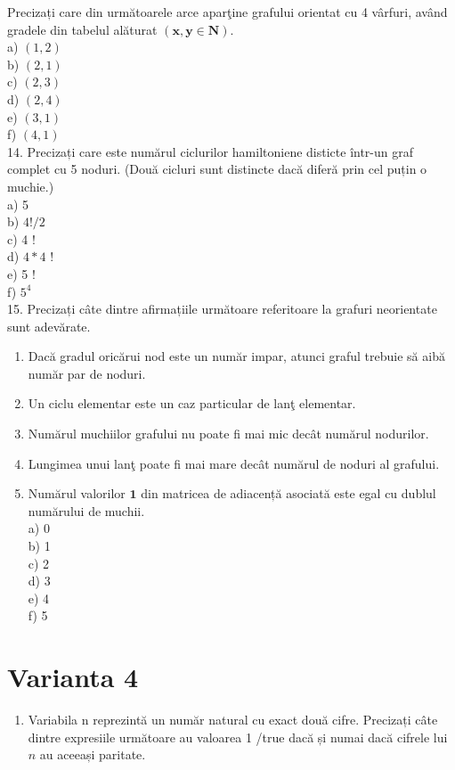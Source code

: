 \documentclass[10pt]{article}
\begin{document}
Precizați care din următoarele arce aparţine grafului orientat cu 4 vârfuri, având gradele din tabelul alăturat $(\mathbf{x}, \mathbf{y} \in \mathbf{N})$.\\
a) $(1,2)$\\
b) $(2,1)$\\
c) $(2,3)$\\
d) $(2,4)$\\
e) $(3,1)$\\
f) $(4,1)$\\
14. Precizați care este numărul ciclurilor hamiltoniene disticte într-un graf complet cu 5 noduri. (Două cicluri sunt distincte dacă diferă prin cel puțin o muchie.)\\
a) 5\\
b) $4!/ 2$\\
c) 4 !\\
d) $4 * 4$ !\\
e) 5 !\\
f) $5^{4}$\\
15. Precizați câte dintre afirmațiile următoare referitoare la grafuri neorientate sunt adevărate.

\begin{enumerate}
  \item Dacă gradul oricărui nod este un număr impar, atunci graful trebuie să aibă număr par de noduri.
  \item Un ciclu elementar este un caz particular de lanţ elementar.
  \item Numărul muchiilor grafului nu poate fi mai mic decât numărul nodurilor.
  \item Lungimea unui lanţ poate fi mai mare decât numărul de noduri al grafului.
  \item Numărul valorilor $\mathbf{1}$ din matricea de adiacență asociată este egal cu dublul numărului de muchii.\\
a) 0\\
b) 1\\
c) 2\\
d) 3\\
e) 4\\
f) 5
\end{enumerate}

\section*{Varianta 4}
\begin{enumerate}
  \item Variabila n reprezintă un număr natural cu exact două cifre. Precizați câte dintre expresiile următoare au valoarea 1 /true dacă și numai dacă cifrele lui $n$ au aceeași paritate.
\end{enumerate}
\end{document}
